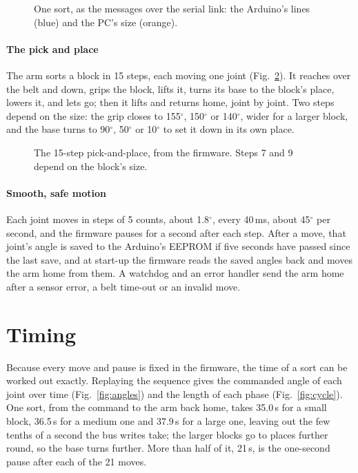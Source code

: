\documentclass[11pt]{article}
\begin{document}
\begin{figure}[htbp]
  \centering
  \caption{One sort, as the messages over the serial link: the Arduino's lines (blue) and the PC's size (orange).}
  \label{fig:serial}
\end{figure}

\paragraph{The pick and place} The arm sorts a block in 15 steps, each moving one joint (Fig.~\ref{fig:pickplace}). It reaches over the belt and down, grips the block, lifts it, turns its base to the block's place, lowers it, and lets go; then it lifts and returns home, joint by joint. Two steps depend on the size: the grip closes to 155$^\circ$, 150$^\circ$ or 140$^\circ$, wider for a larger block, and the base turns to 90$^\circ$, 50$^\circ$ or 10$^\circ$ to set it down in its own place.

\begin{figure}[htbp]
  \centering
  \caption{The 15-step pick-and-place, from the firmware. Steps 7 and 9 depend on the block's size.}
  \label{fig:pickplace}
\end{figure}

\paragraph{Smooth, safe motion} Each joint moves in steps of 5 counts, about 1.8$^\circ$, every 40\,ms, about 45$^\circ$ per second, and the firmware pauses for a second after each step. After a move, that joint's angle is saved to the Arduino's EEPROM if five seconds have passed since the last save, and at start-up the firmware reads the saved angles back and moves the arm home from them. A watchdog and an error handler send the arm home after a sensor error, a belt time-out or an invalid move.

\section{Timing}
\label{sec:timing}

Because every move and pause is fixed in the firmware, the time of a sort can be worked out exactly. Replaying the sequence gives the commanded angle of each joint over time (Fig.~\ref{fig:angles}) and the length of each phase (Fig.~\ref{fig:cycle}). One sort, from the command to the arm back home, takes 35.0\,s for a small block, 36.5\,s for a medium one and 37.9\,s for a large one, leaving out the few tenths of a second the bus writes take; the larger blocks go to places further round, so the base turns further. More than half of it, 21\,s, is the one-second pause after each of the 21 moves.
\end{document}
